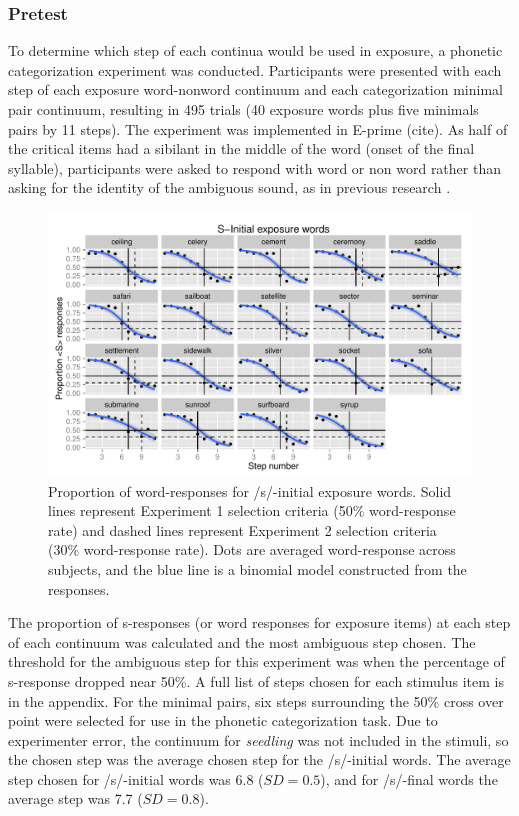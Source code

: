 \subsubsection{Pretest}

To determine which step of each continua would be used in exposure, a phonetic categorization experiment was conducted.  
Participants were presented with each step of each exposure word-nonword continuum and each categorization minimal pair continuum, resulting in 495 trials (40 exposure words plus five minimals pairs by 11 steps).  
The experiment was implemented in E-prime (cite).  
As half of the critical items had a sibilant in the middle of the word (onset of the final syllable), participants were asked to respond with word or non word rather than asking for the identity of the ambiguous sound, as in previous research \citep{Reinisch2013}.  

\begin{figure}
\includegraphics[width=\textwidth]{sinitialpretest.pdf}
\caption{Proportion of word-responses for /s/-initial exposure words. Solid lines represent Experiment 1 selection criteria (50\% word-response rate) and dashed lines represent Experiment 2 selection criteria (30\% word-response rate).  Dots are averaged word-response across subjects, and the blue line is a binomial model constructed from the responses.}
\end{figure}

The proportion of s-responses (or word responses for exposure items) at each step of each continuum was calculated and the most ambiguous step chosen. 
The threshold for the ambiguous step for this experiment was when the percentage of s-response dropped near 50\%. 
A full list of steps chosen for each stimulus item is in the appendix.  For the minimal pairs, six steps surrounding the 50\% cross over point were selected for use in the phonetic categorization task.  
Due to experimenter error, the continuum for \emph{seedling} was not included in the stimuli, so the chosen step was the average chosen step for the /s/-initial words.  
The average step chosen for /s/-initial words was 6.8 ($SD = 0.5$), and for /s/-final words the average step was 7.7 ($SD = 0.8$).

